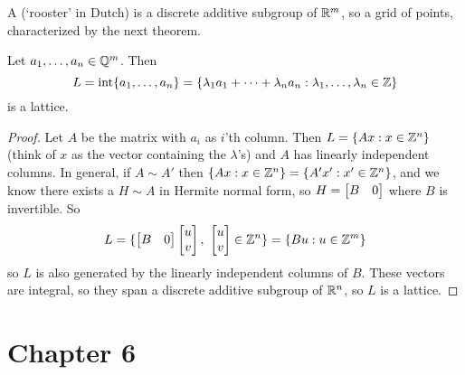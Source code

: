 \documentclass{exam}
\begin{document}
    \begin{define}
        A  (`rooster' in Dutch) is a discrete additive subgroup of $\mathbb{R}^m$, so a grid of points, characterized by the next theorem.
    \end{define}
    \begin{theorem}
        Let $a_1,\dots,a_{n}\in \mathbb{Q} ^m$.
        Then \[ L=\mathrm{int} \{  a_1,\dots,a_n \} = \{ \lambda_1 a_1 + \dots + \lambda_n a_n : \lambda_1,\dots,\lambda_n \in \mathbb{Z} \} \]
        is a lattice.
    \end{theorem}
    \begin{proof}
        Let $A$ be the matrix with $a_i$ as $i$'th column.
        Then $L = \{ Ax : x \in \mathbb{Z} ^n \}$ (think of $x$ as the vector containing the $\lambda$'s) and $A$ has linearly independent columns.
        In general, if $A \sim A'$ then $\{ Ax : x \in \mathbb{Z} ^n \} = \{ A'x': x' \in \mathbb{Z} ^n \}$, and we know there exists a $H \sim A$ in Hermite normal form, so $H = \matrix{B & 0}$ where $B$ is invertible.
        So
        \[
            L = \{ \matrix{B & 0} \matrix{u \\ v},\ \matrix{u\\v} \in \integers ^n \} = \{ Bu : u \in \integers^m \}
        \]
        so $L$ is also generated by the linearly independent columns of $B$.
        These vectors are integral, so they span a discrete additive subgroup of $\mathbb{R}^n$, so $L$ is a lattice.
    \end{proof}

    \section{Chapter 6}
\end{document}
